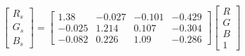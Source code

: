 \begin{equation}
\begin{bmatrix}
  R_s \\ G_s \\ B_s 
\end{bmatrix}=
\left[\begin{matrix}1.38 & -0.027 & -0.101 & -0.429\\ 
-0.025 & 1.214 & 0.107 & -0.304\\ 
-0.082 & 0.226 & 1.09 & -0.286\end{matrix}\right]
\begin{bmatrix}
  R \\ G \\ B \\ 1 
\end{bmatrix}
\end{equation}

